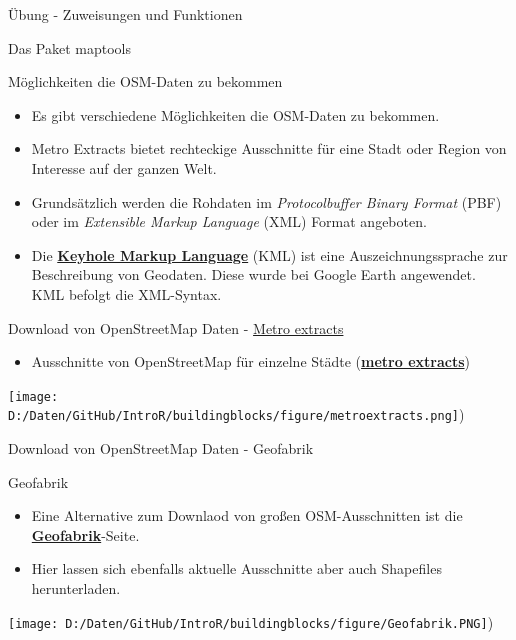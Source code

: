 \documentclass[ignorenonframetext,]{beamer}
\providecommand{\tightlist}{%
  \setlength{\itemsep}{0pt}\setlength{\parskip}{0pt}}
\begin{document}
\begin{frame}[fragile]{Übung - Zuweisungen und Funktionen}
\begin{frame}[fragile]{Das Paket maptools}
\begin{frame}{Möglichkeiten die OSM-Daten zu bekommen}
\begin{itemize}
\tightlist
\item
  Es gibt verschiedene Möglichkeiten die OSM-Daten zu bekommen.
\item
  Metro Extracts bietet rechteckige Ausschnitte für eine Stadt oder
  Region von Interesse auf der ganzen Welt.
\item
  Grundsätzlich werden die Rohdaten im \emph{Protocolbuffer Binary
  Format} (PBF) oder im \emph{Extensible Markup Language} (XML) Format
  angeboten.
\item
  Die
  \href{https://de.wikipedia.org/wiki/Keyhole_Markup_Language}{\textbf{Keyhole
  Markup Language}} (KML) ist eine Auszeichnungssprache zur Beschreibung
  von Geodaten. Diese wurde bei Google Earth angewendet. KML befolgt die
  XML-Syntax.
\end{itemize}

\end{frame}

\begin{frame}{Download von OpenStreetMap Daten -
\href{https://mapzen.com/}{Metro extracts}}

\begin{itemize}
\tightlist
\item
  Ausschnitte von OpenStreetMap für einzelne Städte
  (\href{https://mapzen.com/data/metro-extracts/}{\textbf{metro
  extracts}})
\end{itemize}

\texttt{[image: D:/Daten/GitHub/IntroR/buildingblocks/figure/metroextracts.png]})

\end{frame}

\begin{frame}{Download von OpenStreetMap Daten - Geofabrik}

\begin{block}{Geofabrik}

\begin{itemize}
\tightlist
\item
  Eine Alternative zum Downlaod von großen OSM-Ausschnitten ist die
  \href{http://download.geofabrik.de/}{\textbf{Geofabrik}}-Seite.\\
\item
  Hier lassen sich ebenfalls aktuelle Ausschnitte aber auch Shapefiles
  herunterladen.
\end{itemize}

\texttt{[image: D:/Daten/GitHub/IntroR/buildingblocks/figure/Geofabrik.PNG]})


\end{block}
\end{frame}
\end{frame}
\end{frame}
\end{document}

